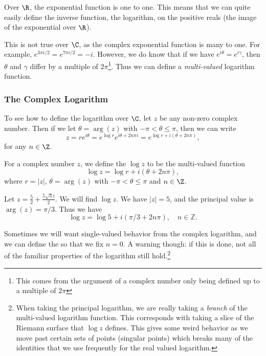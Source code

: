 Over $\R$, the exponential function is one to one. This means that we can quite easily define the inverse function, the logarithm, on the positive reals (the image of the exponential over $\R$).

This is not true over $\C$, as the complex exponential function is many to one. For example, $e^{3\pi i/2} = e^{7 \pi i/2} = -i$. However, we do know that if we have $e^{i\theta} = e^{i \gamma}$, then $\theta$ and $\gamma$ differ by a multiple of $2 \pi$\footnote{This comes from the argument of a complex number only being defined up to a multiple of $2\pi$}. Thus we can define a \emph{multi-valued} logarithm function.

\subsubsection{The Complex Logarithm}

To see how to define the logarithm over $\C$, let $z$ be any non-zero complex number. Then if we let $\theta = \arg(z)$ with $-\pi < \theta \leq \pi$, then we can write
$$
z = re^{i \theta} =  e^{\log r} e^{i \theta + 2n \pi i} = e^{\log r + i(\theta + 2n \pi)},
$$
for any $n \in \Z$.

\begin{definition}
	For a complex number $z$, we define the  $\log z$ to be the multi-valued function
	$$
	\log z = \log r + i(\theta + 2n\pi),
	$$
	where $r = |z|$, $\theta = \arg (z)$ with $- \pi < \theta \leq \pi$ and $n \in \Z$.
\end{definition}

\begin{example}
	Let $z = \frac{5}{2} + \frac{5\sqrt{3} i}{2}$. We will find $\log z$. We have $|z| = 5$, and the principal value is $\arg(z) = \pi/3$. Thus we have
	$$
	\log z = \log 5 + i (\pi/3 + 2n \pi), \quad n \in \mathbb{Z}.
	$$
\end{example}

Sometimes we will want single-valued behavior from the complex logarithm, and we can define the  so that we fix $n = 0$. A warning though: if this is done, not all of the familiar properties of the logarithm still hold.\footnote{When taking the principal logarithm, we are really taking a \emph{branch} of the multi-valued logarithm function. This corresponds with taking a slice of the Riemann surface that $\log z$ defines. This gives some weird behavior as we move past certain sets of points (singular points) which breaks many of the identities that we use frequently for the real valued logarithm.}


